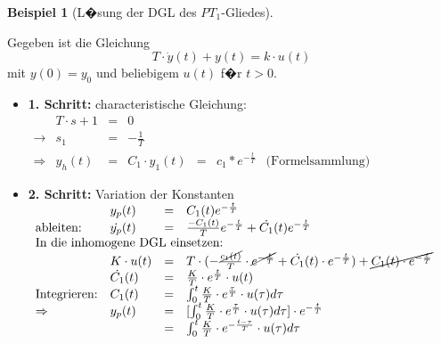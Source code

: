 \documentclass[12pt,a4paper,ngerman]{scrartcl}
\newtheorem{bsp}{Beispiel}[section] %
\begin{document}
  \begin{bsp}[L�sung der DGL des $PT_1$-Gliedes]
\end{bsp}
Gegeben ist die Gleichung
\begin{equation*}
  T\cdot \dot{y}(t)+y(t)=k\cdot u(t)
\end{equation*}
mit $y(0)=y_0$ und beliebigem $u(t)$ f�r $t>0$.
\begin{itemize}
\item \textbf{1. Schritt:} characteristische Gleichung:\\
  \begin{math}
    \begin{array}{llllllll}
      &T\cdot s +1&=&0\\
      \rightarrow&s_1&=&-\frac{1}{T}\\
      \Rightarrow&y_h(t)&=&C_1\cdot y_1(t)&=&c_1*e^{-\frac{t}{T}}&\text{(Formelsammlung)}
    \end{array}
  \end{math}
\item \textbf{2. Schritt:} Variation der Konstanten\\
  \begin{math}
    \begin{array}{lllllllll}
                       &y_p(t)&=&C_1(t)e^{-\frac{t}{T}}\\
      \text{ableiten: }&\dot{y_p}(t)&=&\frac{-C_1(t)}{T}e^{-\frac{t}{T}}+\dot{C_1}(t)e^{-\frac{t}{T}}\\
\multicolumn{4}{l}{\text{In die inhomogene DGL einsetzen:}}\\
&K\cdot u(t)&=&T\cdot (-\frac{\cancel{c_1(t)}}{T}\cdot \cancel{e^{-\frac{t}{T}}}+\dot{C_1}(t)\cdot e^{-\frac{t}{T}})+\cancel{C_1(t)\cdot e^{-\frac{t}{T}}}\\
&\dot{C_1}(t)&=&\frac{K}{T}\cdot e^{\frac{t}{T}}\cdot u(t)\\
\text{Integrieren:}&C_1(t)&=&\int_0^t{\frac{K}{T}\cdot e^{\frac{\tau}{T}}\cdot u(\tau)d\tau}\\
\Rightarrow&y_p(t)&=&[\int_0^t{\frac{K}{T}\cdot e^{\frac{\tau}{T}}\cdot u(\tau)d\tau}]\cdot e^{-\frac{t}{T}}\\
&&=&\int_0^t{\frac{K}{T}\cdot e^{-\frac{t-\tau}{T}}\cdot u(\tau)d\tau}


\end{array}
\end{math}
\end{itemize}
\end{document}
